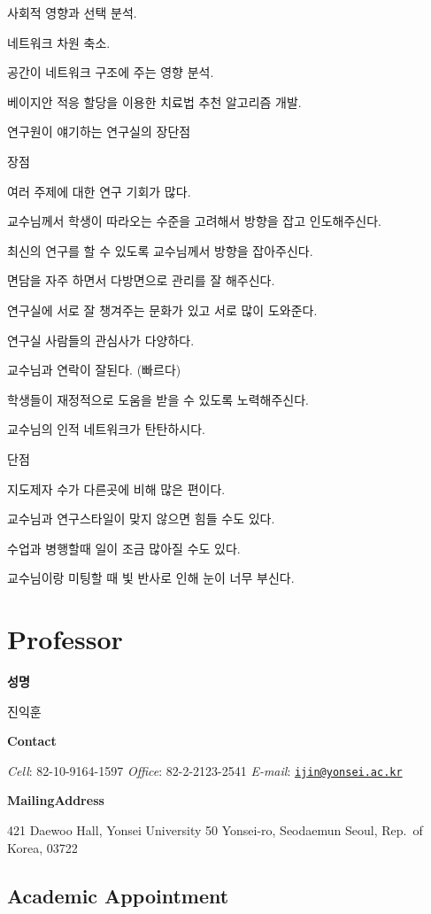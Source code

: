 \documentclass[
]{book}
\begin{document}
사회적 영향과 선택 분석.

네트워크 차원 축소.

공간이 네트워크 구조에 주는 영향 분석.

베이지안 적응 할당을 이용한 치료법 추천 알고리즘 개발.

연구원이 얘기하는 연구실의 장단점

장점

여러 주제에 대한 연구 기회가 많다.

교수님께서 학생이 따라오는 수준을 고려해서 방향을 잡고
인도해주신다.

최신의 연구를 할 수 있도록 교수님께서 방향을 잡아주신다.

면담을 자주 하면서 다방면으로 관리를 잘 해주신다.

연구실에 서로 잘 챙겨주는 문화가 있고 서로 많이 도와준다.

연구실 사람들의 관심사가 다양하다.

교수님과 연락이 잘된다. (빠르다)

학생들이 재정적으로 도움을 받을 수 있도록 노력해주신다.

교수님의 인적 네트워크가 탄탄하시다.

단점

지도제자 수가 다른곳에 비해 많은 편이다.

교수님과 연구스타일이 맞지 않으면 힘들 수도 있다.

수업과 병행할때 일이 조금 많아질 수도 있다.

교수님이랑 미팅할 때 빛 반사로 인해 눈이 너무 부신다.

\hypertarget{professor}{%
\chapter*{Professor}\label{professor}}

\textbf{성명}

진익훈

\textbf{Contact}

\emph{Cell}: 82-10-9164-1597
\emph{Office}: 82-2-2123-2541
\emph{E-mail}: \href{mailto:ijin@yonsei.ac.kr}{\nolinkurl{ijin@yonsei.ac.kr}}

\textbf{Mailing}\textbf{Address}

421 Daewoo Hall, Yonsei University
50 Yonsei-ro, Seodaemun
Seoul, Rep.~of Korea, 03722

\hypertarget{academic-appointment}{%
\section*{Academic Appointment}\label{academic-appointment}}
\end{document}
